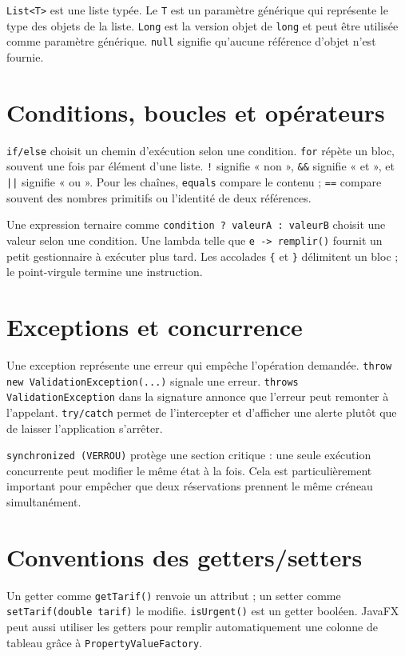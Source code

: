 \documentclass[11pt,a4paper]{report}
\begin{document}
\texttt{List<T>} est une liste typée. Le \texttt{T} est un paramètre générique qui représente le type des objets de la liste. \texttt{Long} est la version objet de \texttt{long} et peut être utilisée comme paramètre générique. \texttt{null} signifie qu'aucune référence d'objet n'est fournie.

\section{Conditions, boucles et opérateurs}
\texttt{if/else} choisit un chemin d'exécution selon une condition. \texttt{for} répète un bloc, souvent une fois par élément d'une liste. \texttt{!} signifie « non », \texttt{\&\&} signifie « et », et \texttt{||} signifie « ou ». Pour les chaînes, \texttt{equals} compare le contenu ; \texttt{==} compare souvent des nombres primitifs ou l'identité de deux références.

Une expression ternaire comme \texttt{condition ? valeurA : valeurB} choisit une valeur selon une condition. Une lambda telle que \texttt{e -> remplir()} fournit un petit gestionnaire à exécuter plus tard. Les accolades \texttt{\{} et \texttt{\}} délimitent un bloc ; le point-virgule termine une instruction.

\section{Exceptions et concurrence}
Une exception représente une erreur qui empêche l'opération demandée. \texttt{throw new ValidationException(...)} signale une erreur. \texttt{throws ValidationException} dans la signature annonce que l'erreur peut remonter à l'appelant. \texttt{try/catch} permet de l'intercepter et d'afficher une alerte plutôt que de laisser l'application s'arrêter.

\texttt{synchronized (VERROU)} protège une section critique : une seule exécution concurrente peut modifier le même état à la fois. Cela est particulièrement important pour empêcher que deux réservations prennent le même créneau simultanément.

\section{Conventions des getters/setters}
Un getter comme \texttt{getTarif()} renvoie un attribut ; un setter comme \texttt{setTarif(double tarif)} le modifie. \texttt{isUrgent()} est un getter booléen. JavaFX peut aussi utiliser les getters pour remplir automatiquement une colonne de tableau grâce à \texttt{PropertyValueFactory}.
\end{document}
